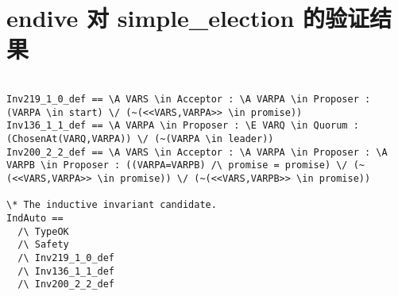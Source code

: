 \appendix
\chapter{endive 对 simple\_election 的验证结果}\label{app:endive_simple_election}
\begin{lstlisting}
  
Inv219_1_0_def == \A VARS \in Acceptor : \A VARPA \in Proposer : (VARPA \in start) \/ (~(<<VARS,VARPA>> \in promise))
Inv136_1_1_def == \A VARPA \in Proposer : \E VARQ \in Quorum : (ChosenAt(VARQ,VARPA)) \/ (~(VARPA \in leader))
Inv200_2_2_def == \A VARS \in Acceptor : \A VARPA \in Proposer : \A VARPB \in Proposer : ((VARPA=VARPB) /\ promise = promise) \/ (~(<<VARS,VARPA>> \in promise)) \/ (~(<<VARS,VARPB>> \in promise))

\* The inductive invariant candidate.
IndAuto ==
  /\ TypeOK
  /\ Safety
  /\ Inv219_1_0_def
  /\ Inv136_1_1_def
  /\ Inv200_2_2_def
\end{lstlisting}